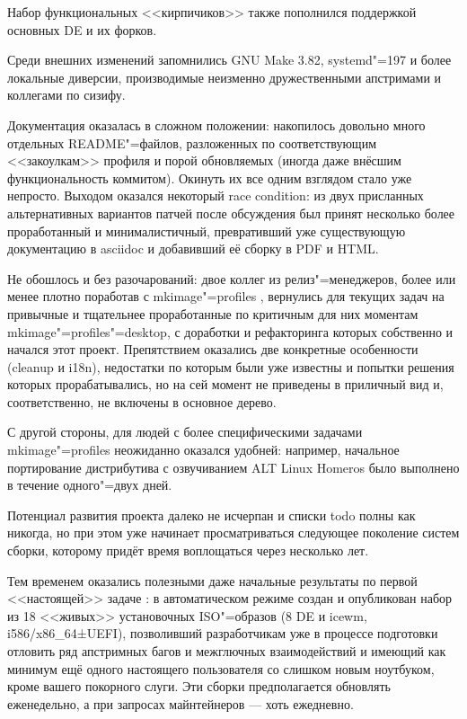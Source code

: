 \documentclass[10pt, a5paper]{article}
\begin{document}
Набор функциональных <<кирпичиков>> также пополнился поддержкой основных DE и их форков.

Среди внешних изменений запомнились GNU Make 3.82, systemd"=197 и более локальные диверсии, производимые неизменно дружественными апстримами и коллегами по сизифу.

Документация оказалась в сложном положении: накопилось довольно много отдельных README"=файлов, разложенных по соответствующим <<закоулкам>> профиля и порой обновляемых (иногда даже внёсшим функциональность коммитом). Окинуть их все одним взглядом стало уже непросто. Выходом оказался некоторый race condition: из двух присланных альтернативных вариантов патчей после обсуждения был принят несколько более проработанный и минималистичный, превративший уже существующую документацию в asciidoc и добавивший её сборку в PDF и HTML.

Не обошлось и без разочарований: двое коллег из релиз"=менеджеров, более или менее плотно поработав с mkimage"=profiles \cite{Shigorinw2}, вернулись для текущих задач на привычные и тщательнее проработанные по критичным для них моментам mkimage"=profiles"=desktop, с доработки и рефакторинга которых собственно и начался этот проект.  Препятствием оказались две конкретные особенности (cleanup и i18n), недостатки по которым были уже известны и попытки решения которых прорабатывались, но на сей момент не приведены в приличный вид и, соответственно, не включены в основное дерево.

С другой стороны, для людей с более специфическими задачами mkimage"=profiles неожиданно оказался удобней: например, начальное портирование дистрибутива с озвучиванием ALT Linux Homeros было выполнено в течение одного"=двух дней.

Потенциал развития проекта далеко не исчерпан и списки todo полны как никогда, но при этом уже начинает просматриваться следующее поколение систем сборки, которому придёт время воплощаться через несколько лет.

Тем временем оказались полезными даже начальные результаты по первой <<настоящей>> задаче \cite{Shigorinw3}: в автоматическом режиме создан и опубликован набор из 18 <<живых>> установочных ISO"=образов (8 DE и icewm, i586/x86\_64±UEFI), позволивший разработчикам уже в процессе подготовки отловить ряд апстримных багов и межглючных взаимодействий и имеющий как минимум ещё одного настоящего пользователя со слишком новым ноутбуком, кроме вашего покорного слуги.  Эти сборки предполагается обновлять еженедельно, а при запросах майнтейнеров --- хоть ежедневно.
\end{document}
